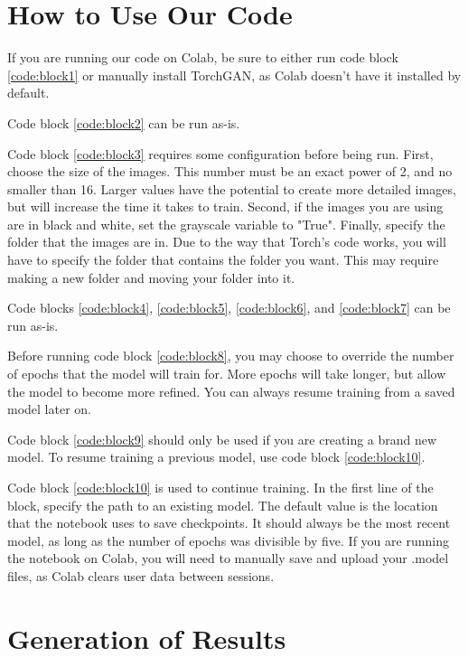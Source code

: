 \documentclass[11pt,letterpaper]{article}
\begin{document}
	\section{How to Use Our Code}
		If you are running our code on Colab, be sure to either run code block \ref{code:block1} or manually install TorchGAN, as Colab doesn't have it installed by default.

		Code block \ref{code:block2} can be run as-is.

		Code block \ref{code:block3} requires some configuration before being run.
		First, choose the size of the images.
		This number must be an exact power of 2, and no smaller than 16.
		Larger values have the potential to create more detailed images, but will increase the time it takes to train.
		Second, if the images you are using are in black and white, set the grayscale variable to "True".
		Finally, specify the folder that the images are in.
		Due to the way that Torch's code works, you will have to specify the folder that contains the folder you want.
		This may require making a new folder and moving your folder into it.

		Code blocks \ref{code:block4}, \ref{code:block5}, \ref{code:block6}, and \ref{code:block7} can be run as-is.

		Before running code block \ref{code:block8}, you may choose to override the number of epochs that the model will train for.
		More epochs will take longer, but allow the model to become more refined.
		You can always resume training from a saved model later on.

		Code block \ref{code:block9} should only be used if you are creating a brand new model.
		To resume training a previous model, use code block \ref{code:block10}.

		Code block \ref{code:block10} is used to continue training.
		In the first line of the block, specify the path to an existing model.
		The default value is the location that the notebook uses to save checkpoints.
		It should always be the most recent model, as long as the number of epochs was divisible by five.
		If you are running the notebook on Colab, you will need to manually save and upload your .model files, as Colab clears user data between sessions.

	\section{Generation of Results}
\end{document}
